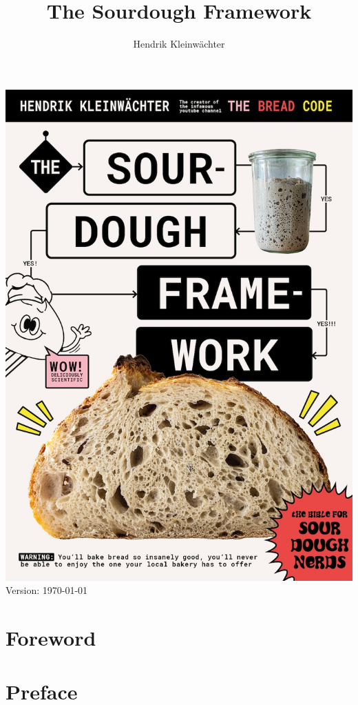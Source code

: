 \documentclass[a4paper, 12pt]{book}
\author{Hendrik Kleinwächter}
\title{The Sourdough Framework}
\begin{document}
\frontmatter
\begin{titlepage}
\begin{center}
  \includegraphics[width=\textwidth]{images/cover-page.jpg}
  Version:
  \today
\end{center}
\end{titlepage}


\ifdefined\HCode\else\tableofcontents\fi

\chapter{Foreword}


\chapter{Preface}

\end{document}
